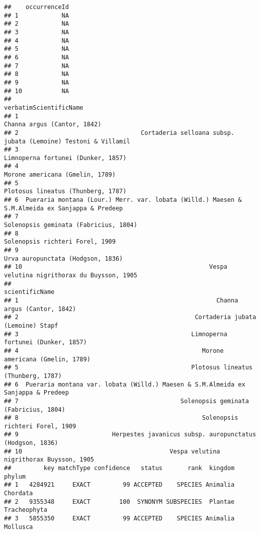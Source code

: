 \documentclass[
]{article}
\begin{document}
\begin{verbatim}
##    occurrenceId
## 1            NA
## 2            NA
## 3            NA
## 4            NA
## 5            NA
## 6            NA
## 7            NA
## 8            NA
## 9            NA
## 10           NA
##                                                                            verbatimScientificName
## 1                                                                     Channa argus (Cantor, 1842)
## 2                                  Cortaderia selloana subsp. jubata (Lemoine) Testoni & Villamil
## 3                                                              Limnoperna fortunei (Dunker, 1857)
## 4                                                                 Morone americana (Gmelin, 1789)
## 5                                                              Plotosus lineatus (Thunberg, 1787)
## 6  Pueraria montana (Lour.) Merr. var. lobata (Willd.) Maesen & S.M.Almeida ex Sanjappa & Predeep
## 7                                                           Solenopsis geminata (Fabricius, 1804)
## 8                                                                 Solenopsis richteri Forel, 1909
## 9                                                               Urva auropunctata (Hodgson, 1836)
## 10                                                    Vespa velutina nigrithorax du Buysson, 1905
##                                                                      scientificName
## 1                                                       Channa argus (Cantor, 1842)
## 2                                                 Cortaderia jubata (Lemoine) Stapf
## 3                                                Limnoperna fortunei (Dunker, 1857)
## 4                                                   Morone americana (Gmelin, 1789)
## 5                                                Plotosus lineatus (Thunberg, 1787)
## 6  Pueraria montana var. lobata (Willd.) Maesen & S.M.Almeida ex Sanjappa & Predeep
## 7                                             Solenopsis geminata (Fabricius, 1804)
## 8                                                   Solenopsis richteri Forel, 1909
## 9                          Herpestes javanicus subsp. auropunctatus (Hodgson, 1836)
## 10                                         Vespa velutina nigrithorax Buysson, 1905
##         key matchType confidence   status       rank  kingdom       phylum
## 1   4284921     EXACT         99 ACCEPTED    SPECIES Animalia     Chordata
## 2   9355348     EXACT        100  SYNONYM SUBSPECIES  Plantae Tracheophyta
## 3   5855350     EXACT         99 ACCEPTED    SPECIES Animalia     Mollusca

\end{verbatim}
\end{document}
